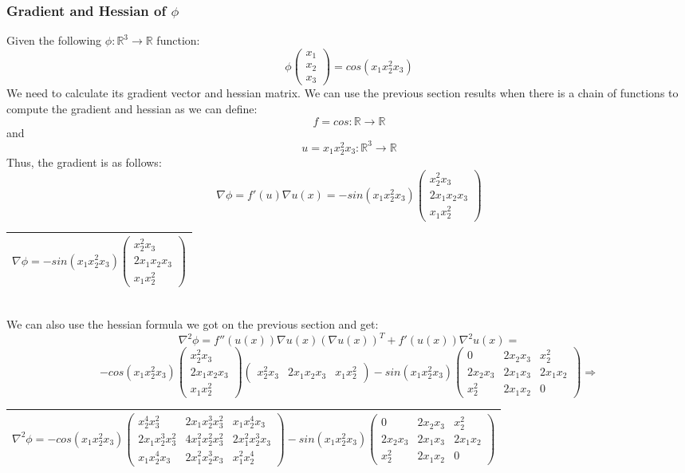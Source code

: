 \documentclass[12pt]{article}
\newcommand{\rectres}[1]{
\begin{center}
\begin{tabular}{ |c| }
\hline
 #1\\
\hline
\end{tabular}
\end{center}
}
\begin{document}
\subsubsection{Gradient and Hessian of $\phi$}
Given the following $\phi:\mathbb{R}^3\rightarrow\mathbb{R}$ function:
$$\phi \begin{pmatrix}x_1\\x_2\\x_3 \end{pmatrix} = cos(x_1x^2_2x_3)$$
We need to calculate its gradient vector and hessian matrix.
We can use the previous section results when there is a chain of functions to compute the gradient and hessian as we can define:
$$f=cos:\mathbb{R}\rightarrow\mathbb{R}$$ and $$u=x_1x^2_2x_3:\mathbb{R}^3\rightarrow\mathbb{R}$$
Thus, the gradient is as follows:
$$\nabla \phi = f'(u)\nabla u(x) = -sin(x_1x^2_2x_3)\begin{pmatrix}x^2_2x_3\\2x_1x_2x_3\\x_1x^2_2 \end{pmatrix}$$
\rectres{$\nabla \phi = -sin(x_1x^2_2x_3)\begin{pmatrix}x^2_2x_3\\2x_1x_2x_3\\x_1x^2_2 \end{pmatrix}$}\\
We can also use the hessian formula we got on the previous section and get:
$$\nabla^2 \phi = f''(u(x))\nabla u(x)(\nabla u(x))^T + f'(u(x))\nabla^2 u(x)=$$
$$-cos(x_1x^2_2x_3)\begin{pmatrix}x^2_2x_3\\2x_1x_2x_3\\x_1x^2_2 \end{pmatrix}\begin{pmatrix}x^2_2x_3 & 2x_1x_2x_3 & x_1x^2_2 \end{pmatrix} - sin(x_1x^2_2x_3)\begin{pmatrix}0 & 2x_2x_3 & x^2_2\\2x_2x_3 & 2x_1x_3 & 2x_1x_2\\x^2_2 & 2x_1x_2 & 0 \end{pmatrix} \Rightarrow$$
\rectres{$\nabla^2 \phi = -cos(x_1x^2_2x_3)\begin{pmatrix}x^4_2x^2_3 & 2x_1x^3_2x^2_3 & x_1x^4_2x_3\\2x_1x^3_2x^2_3 & 4x^2_1x^2_2x^2_3 & 2x^2_1x^3_2x_3\\x_1x^4_2x_3 & 2x^2_1x^3_2x_3 & x^2_1x^4_2 \end{pmatrix} - sin(x_1x^2_2x_3)\begin{pmatrix}0 & 2x_2x_3 & x^2_2\\2x_2x_3 & 2x_1x_3 & 2x_1x_2\\x^2_2 & 2x_1x_2 & 0 \end{pmatrix}$}
\end{document}
